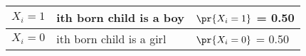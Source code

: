\begin{tabular}{|l|l|l|}\hline
$X_i = 1$	&ith born child is a boy	&$\pr{X_i = 1}$ = 0.50\\\hline
$X_i = 0$	&ith born child is a girl	&$\pr{X_i = 0}$ = 0.50\\\hline
\end{tabular}
